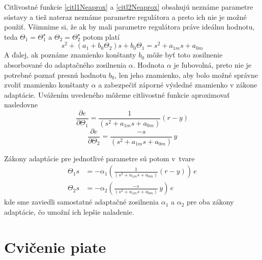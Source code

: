 \documentclass[a4paper, 10pt, ]{article}
\begin{document}
Citlivostné funkcie \eqref{citl1Neaprox} a \eqref{citl2Neaprox} obsahujú neznáme parametre sústavy a tiež nateraz neznáme parametre regulátora a preto ich nie je možné použiť. Všimnime si, že ak by mali parametre regulátora práve ideálnu hodnotu, teda ${\Theta}_1 = {\Theta}_1^\star$ a ${\Theta}_2 = {\Theta}_2^\star$ potom platí
\begin{equation}
	s^2 + \left( a_1 + b_0 \Theta_2 \right) s + b_0 \Theta_1 = s^2 + a_{1m} s + a_{0m}
\end{equation}
A ďalej, ak poznáme znamienko konštanty $b_0$ môže byť toto zosilnenie absorbované do adaptačného zosilnenia $\alpha$. Hodnota $\alpha$ je ľubovolná, preto nie je potrebné poznať presnú hodnotu $b_0$, len jeho znamienko, aby bolo možné správne zvoliť znamienko konštanty $\alpha$ a zabezpečiť záporné výsledné znamienko v zákone adaptácie.  Uvážením uvedeného môžeme citlivostné funkcie aproximovať nasledovne
\begin{equation} \label{citl1Aprox}
	\frac{\partial e}{\partial \Theta_1} = \frac{1}{ \left( s^2 + a_{1m} s + a_{0m} \right) } \left( r - y \right)
\end{equation}
\begin{equation} \label{citl2Aprox}
	\frac{\partial e}{\partial \Theta_2} = \frac{-s} { \left( s^2 + a_{1m} s + a_{0m} \right) } \,	y
\end{equation}

Zákony adaptácie pre jednotlivé parametre sú potom v~tvare
\begin{align}
	\Theta_1 s &= - \alpha_1 \left( \frac{1}{ \left( s^2 + a_{1m} s + a_{0m} \right) } \left( r - y \right) \right) \, e \\
	\Theta_2 s &= - \alpha_2 \left( \frac{-s}{ \left( s^2 + a_{1m} s + a_{0m} \right)} \, y \right) \, e
\end{align}
kde sme zaviedli samostatné adaptačné zosilnenia $\alpha_1$ a $\alpha_2$ pre oba zákony adaptácie, čo umožní ich lepšie naladenie.








\section{Cvičenie piate}
\label{cvicpiate}
\end{document}
